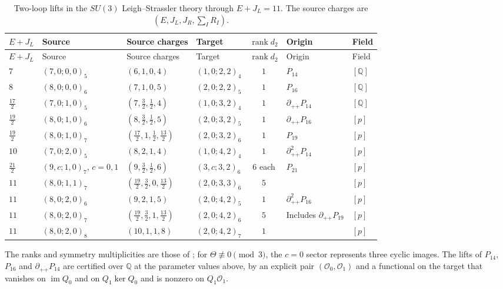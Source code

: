 \documentclass[11pt]{article}
\numberwithin{equation}{section}
\numberwithin{figure}{section}
\numberwithin{table}{section}
\begin{document}
{\footnotesize\renewcommand{\arraystretch}{1.3}\setlength{\tabcolsep}{3.5pt}
\begin{xltabular}{\linewidth}{|l|l|l|l|c|>{\raggedright\arraybackslash}X|l|}
\caption{Two-loop lifts in the $SU(3)$ Leigh--Strassler theory through $E+J_L=11$. The source charges are $(E,J_L,J_R,\sum_IR_I)$.}\label{local-ch9-ls-lifts}\\
\hline
$E+J_L$ & Source & Source charges & Target & $\operatorname{rank}d_2$ & Origin & Field\\
\hline\endfirsthead
\hline
$E+J_L$ & Source & Source charges & Target & $\operatorname{rank}d_2$ & Origin & Field\\
\hline\endhead
$7$ & $(7,0;0,0)_5$ & $(6,1,0,4)$ & $(1,0;2,2)_4$ & $1$ & $P_{14}$ & $[\mathbb Q]$\\
\hline
$8$ & $(8,0;0,0)_6$ & $(7,1,0,5)$ & $(2,0;2,2)_5$ & $1$ & $P_{16}$ & $[\mathbb Q]$\\
\hline
$\tfrac{17}2$ & $(7,0;1,0)_5$ & $(7,\tfrac32,\tfrac12,4)$ & $(1,0;3,2)_4$ & $1$ & $\partial_{+\dot+}P_{14}$ & $[\mathbb Q]$\\
\hline
$\tfrac{19}2$ & $(8,0;1,0)_6$ & $(8,\tfrac32,\tfrac12,5)$ & $(2,0;3,2)_5$ & $1$ & $\partial_{+\dot+}P_{16}$ & $[p]$\\
\hline
$\tfrac{19}2$ & $(8,0;1,0)_7$ & $(\tfrac{17}2,1,\tfrac12,\tfrac{13}2)$ & $(2,0;3,2)_6$ & $1$ & $P_{19}$ & $[p]$\\
\hline
$10$ & $(7,0;2,0)_5$ & $(8,2,1,4)$ & $(1,0;4,2)_4$ & $1$ & $\partial_{+\dot+}^2P_{14}$ & $[p]$\\
\hline
$\tfrac{21}2$ & $(9,c;1,0)_7$, $c=0,1$ & $(9,\tfrac32,\tfrac12,6)$ & $(3,c;3,2)_6$ & $6$ each & $P_{21}$ & $[p]$\\
\hline
$11$ & $(8,0;1,1)_7$ & $(\tfrac{19}2,\tfrac32,0,\tfrac{13}2)$ & $(2,0;3,3)_6$ & $5$ & & $[p]$\\
\hline
$11$ & $(8,0;2,0)_6$ & $(9,2,1,5)$ & $(2,0;4,2)_5$ & $1$ & $\partial_{+\dot+}^2P_{16}$ & $[p]$\\
\hline
$11$ & $(8,0;2,0)_7$ & $(\tfrac{19}2,\tfrac32,1,\tfrac{13}2)$ & $(2,0;4,2)_6$ & $5$ & Includes $\partial_{+\dot+}P_{19}$ & $[p]$\\
\hline
$11$ & $(8,0;2,0)_8$ & $(10,1,1,8)$ & $(2,0;4,2)_7$ & $1$ & & $[p]$\\
\hline
\end{xltabular}}

The ranks and symmetry multiplicities are those of \cite[supplement, Section S6.2]{Repo}; for $\Theta\not\equiv0\pmod3$, the $c=0$ sector represents three cyclic images. The lifts of $P_{14}$, $P_{16}$ and $\partial_{+\dot+}P_{14}$ are certified over $\mathbb Q$ at the parameter values above, by an explicit pair $(\mathcal O_0,\mathcal O_1)$ and a functional on the target that vanishes on $\operatorname{im}Q_0$ and on $Q_1\ker Q_0$ and is nonzero on $Q_1\mathcal O_1$.
\end{document}
